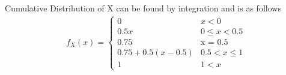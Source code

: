 \documentclass[../../probability-notes.tex]{subfile}
\begin{document}
Cumulative Distribution of X can be found by integration and is as follows
        \begin{align*}
            f_{X}(x) = \begin{cases} 0 &\mbox{$x < 0$}\\
                                     0.5x &\mbox{$0 \leq x < 0.5$}\\
                                     0.75 &\mbox{x = 0.5}\\
                                     0.75 + 0.5(x-0.5) &\mbox{$0.5 < x \leq 1$} \\
                                     1 &\mbox {$1 < x$}\end{cases}
        \end{align*}
\end{document}
